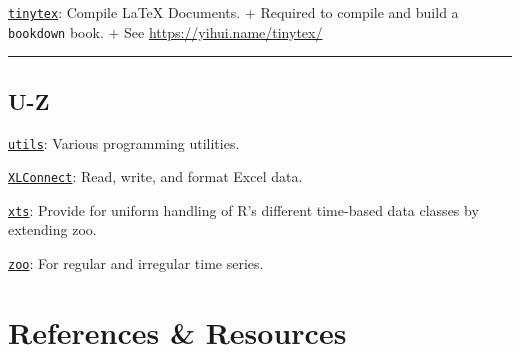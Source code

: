 \documentclass[]{book}
\theoremstyle{definition}
\theoremstyle{definition}
\theoremstyle{definition}
\theoremstyle{remark}
\begin{document}
\href{https://CRAN.R-project.org/package=tinytex}{\texttt{tinytex}}:
Compile LaTeX Documents. + Required to compile and build a
\texttt{bookdown} book. + See \url{https://yihui.name/tinytex/}

\begin{center}\rule{0.5\linewidth}{\linethickness}\end{center}

\section{U-Z}\label{u-z}

\href{https://CRAN.R-project.org/package=R.utils}{\texttt{utils}}:
Various programming utilities.

\href{https://CRAN.R-project.org/package=XLConnect}{\texttt{XLConnect}}:
Read, write, and format Excel data.

\href{https://CRAN.R-project.org/package=xts}{\texttt{xts}}: Provide for
uniform handling of R's different time-based data classes by extending
zoo.

\href{https://CRAN.R-project.org/package=zoo}{\texttt{zoo}}: For regular
and irregular time series.

\chapter{References \& Resources}\label{references-resources}
\end{document}
